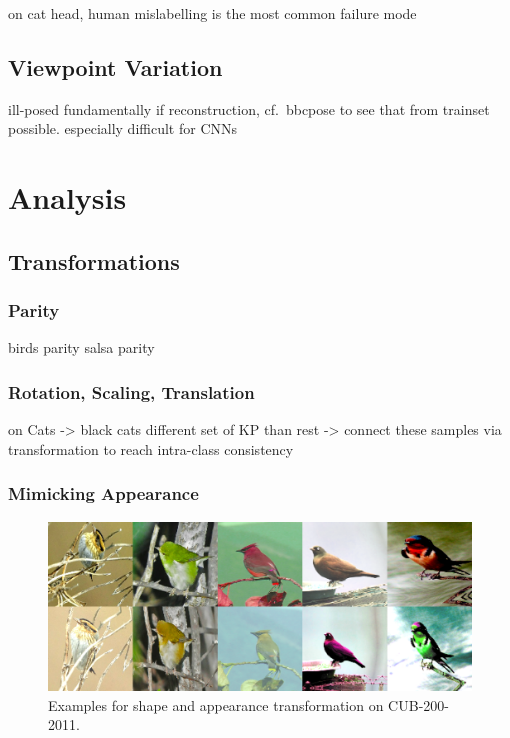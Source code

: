 		on cat head, human mislabelling is the most common failure mode

	\subsection{Viewpoint Variation}\label{sec:viewpoint}
		ill-posed fundamentally if reconstruction, cf.\ bbcpose to see that from trainset possible.
		especially difficult for CNNs~\cite{sabour17capsule}


\section{Analysis}
	\subsection{Transformations}\label{sec:transformations}

		\subsubsection{Parity}
			birds parity
			salsa parity

		\subsubsection{Rotation, Scaling, Translation}
			on Cats -> black cats different set of KP than rest -> connect these samples via transformation to reach intra-class consistency

		\subsubsection{Mimicking Appearance}
			\begin{figure}[htp]
				\centering
				\includegraphics[trim={0cm 0cm 0cm 0cm},clip, width=.8\linewidth]{fig/shape/coloraugm}
				\caption{Examples for shape and appearance transformation on CUB-200-2011.}
				\label{fig:compare}
			\end{figure}


